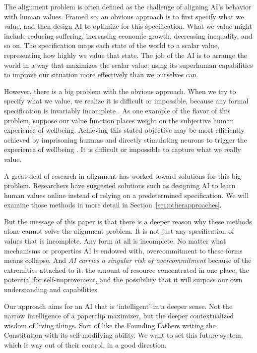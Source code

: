 The alignment problem is often defined as the challenge of aligning AI's behavior with human values. Framed so, an obvious approach is to first specify what we value, and then design AI to optimize for this specification. What we value might include reducing suffering, increasing economic growth, decreasing inequality, and so on. The specification maps each state of the world to a scalar value, representing how highly we value that state. The job of the AI is to arrange the world in a way that maximizes the scalar value: using its superhuman capabilities to improve our situation more effectively than we ourselves can.

However, there is a big problem with the obvious approach. When we try to specify what we value, we realize it is difficult or impossible, because any formal specification is invariably incomplete \citep{krakovna2020specification, russell2019human, grossman1986costs, hadfield2019incomplete, zhuang2020consequences, gabriel2020artificial, wiener1960some, amodei2016concrete}. As one example of the flavor of this problem, suppose our value function places weight on the subjective human experience of wellbeing. Achieving this stated objective may be most efficiently achieved by imprisoning humans and directly stimulating neurons to trigger the experience of wellbeing \citep{bostrom2014superintelligence}. It is difficult or impossible to capture what we really value.

A great deal of research in alignment has worked toward solutions for this big problem. Researchers have suggested solutions such as designing AI to learn human values online instead of relying on a predetermined specification. We will examine those methods in more detail in Section~\ref{sec:otherapproaches}. 

But the message of this paper is that there is a deeper reason why these methods alone cannot solve the alignment problem. It is not just any specification of values that is incomplete. Any form at all is incomplete. No matter what mechanisms or properties AI is endowed with, overcommitment to these forms means collapse. And \textit{AI carries a singular risk of overcommitment} because of the extremities attached to it: the amount of resource concentrated in one place, the potential for self-improvement, and the possibility that it will surpass our own understanding and capabilities. 


Our approach aims for an AI that is `intelligent' in a deeper sense. Not the narrow intelligence of a paperclip maximizer, but the deeper contextualized wisdom of living things. Sort of like the Founding Fathers writing the Constitution with its self-modifying ability. We want to set this future system, which is way out of their control, in a good direction. 

